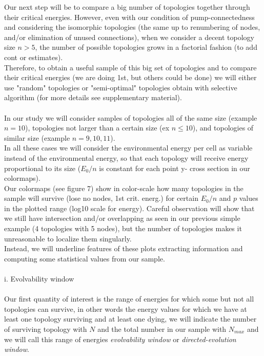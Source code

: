 \documentclass{amsart}
\theoremstyle{plain}
\numberwithin{equation}{section}
\begin{document}
Our next step will be to compare a big number of topologies together through their critical energies. However, even with our condition of pump-connectedness and considering the isomorphic topologies (the same up to renumbering of nodes, and/or elimination of unused connections), when we consider a decent topology size $n>5$, the number of possible topologies grows in a factorial fashion (to add cont or estimates).\\ Therefore, to obtain a useful sample of this big set of topologies and to compare their critical energies (we are doing 1st, but others could be done) we will either use "random" topologies or "semi-optimal" topologies obtain with selective algorithm (for more details see supplementary material).\\\\
In our study we will consider samples of topologies all of the same size (example $n=10$), topologies not larger than a certain size (ex $n\leq10$),  and topologies of similar size (example $n=9,10,11$).\\
In all these cases we will consider the environmental energy per cell as variable instead of the environmental energy, so that each topology will receive energy proportional to its size ($E_0/n$ is constant for each point y- cross section in our colormaps).\\
Our colormaps (see figure 7) show in color-scale how many topologies in the sample will survive (lose no nodes, 1st crit. energ.) for certain $E_0/n$ and $p$ values in the plotted range (log10 scale for energy).
Careful observation will show that we still have intersection and/or overlapping as seen in our previous simple example (4 topologies with 5 nodes), but the number of topologies makes it unreasonable to localize them singularly.\\
Instead, we will underline features of these plots extracting information and computing some statistical values from our sample.\\
\\i. Evolvability window\\\\
Our first quantity of interest is the range of energies for which some but not all topologies can survive, in other words the energy values for which we have at least one topology surviving and at least one dying, we will indicate the number of surviving topology with $N$ and the total number in our sample with $N_{max}$ and we will call this range of energies \textit{evolvability window} or \textit{directed-evolution window}. \\
\end{document}
